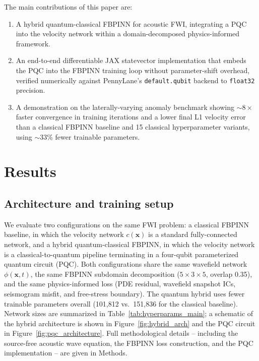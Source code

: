\documentclass[11pt,a4paper]{article}
\begin{document}
The main contributions of this paper are:
\begin{enumerate}
    \item A hybrid quantum-classical FBPINN for acoustic FWI, integrating a PQC into the velocity network within a domain-decomposed physics-informed framework.
    \item An end-to-end differentiable JAX statevector implementation that embeds the PQC into the FBPINN training loop without parameter-shift overhead, verified numerically against PennyLane's \texttt{default.qubit} backend to \texttt{float32} precision.
    \item A demonstration on the laterally-varying anomaly benchmark showing $\sim$$8\times$ faster convergence in training iterations and a lower final L1 velocity error than a classical FBPINN baseline and 15 classical hyperparameter variants, using $\sim$$33$\% fewer trainable parameters.
\end{enumerate}

\section{Results}\label{sec:results}

\subsection{Architecture and training setup}
\label{sec:results_setup}

We evaluate two configurations on the same FWI problem: a classical FBPINN baseline, in which the velocity network $c(\mathbf{x})$ is a standard fully-connected network, and a hybrid quantum-classical FBPINN, in which the velocity network is a classical-to-quantum pipeline terminating in a four-qubit parameterized quantum circuit (PQC). Both configurations share the same wavefield network $\phi(\mathbf{x},t)$, the same FBPINN subdomain decomposition ($5\!\times\!3\!\times\!5$, overlap 0.35), and the same physics-informed loss (PDE residual, wavefield snapshot ICs, seismogram misfit, and free-stress boundary). The quantum hybrid uses fewer trainable parameters overall (101{,}812 vs.\ 151{,}836 for the classical baseline). Network sizes are summarized in Table~\ref{tab:hyperparams_main}; a schematic of the hybrid architecture is shown in Figure~\ref{fig:hybrid_arch} and the PQC circuit in Figure~\ref{fig:pqc_architecture}. Full methodological details -- including the source-free acoustic wave equation, the FBPINN loss construction, and the PQC implementation -- are given in Methods.
\end{document}
